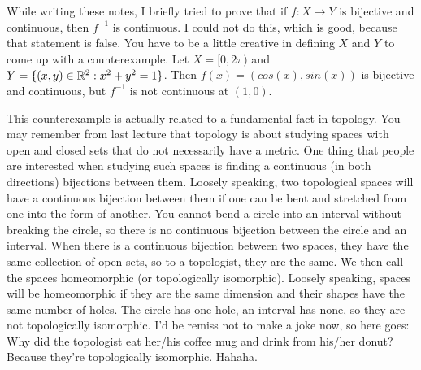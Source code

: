 \begin{remark}
  While writing these notes, I briefly tried to prove that if $f:X \to
  Y$ is bijective and continuous, then $f^{-1}$ is continuous. I could
  not do this, which is good, because that statement is false. You have
  to be a little creative in defining $X$ and $Y$ to come up with a
  counterexample. Let $X = [0,2\pi)$ and $Y = \{(x,y) \in \mathbb{R}^2: x^2 +
  y^2 = 1 \}$. Then $f(x) = (cos(x), sin(x))$ is bijective and
  continuous, but $f^{-1}$ is not continuous at $(1,0)$. 
  
  This counterexample is actually related to a fundamental fact in
  topology. You may remember from last lecture that topology is about
  studying spaces with open and closed sets that do not necessarily
  have a metric. One thing that people are interested when studying
  such spaces is finding a continuous (in both directions) bijections
  between them. Loosely speaking, two topological spaces will have a
  continuous bijection between them if one can be bent and stretched
  from one into the form of another. You cannot bend a circle into an
  interval without breaking the circle, so there is no continuous
  bijection between the circle and an interval. When there is a
  continuous bijection between two spaces, they have the same
  collection of open sets, so to a topologist, they are the same. We
  then call the spaces homeomorphic (or topologically
  isomorphic). Loosely speaking, spaces will be homeomorphic if they
  are the same dimension and their shapes have the same number of
  holes.  The circle has one hole, an interval has none, so they are
  not topologically isomorphic. I'd be remiss not to make a joke now,
  so here goes: Why did the topologist eat her/his coffee mug and
  drink from his/her donut?  Because they're topologically
  isomorphic. Hahaha.
\end{remark}

